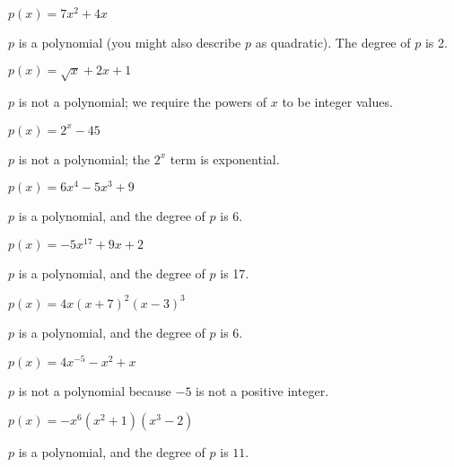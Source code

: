 \begin{exercises}
\begin{problem}
\begin{multicols}{3}
\begin{subproblem}
\begin{shortsolution}
		\end{shortsolution}
	\end{subproblem}
	\begin{subproblem}
		$p(x)=7x^2+4x$
		\begin{shortsolution}
			$p$ is a polynomial (you might also describe $p$ as quadratic). The degree of $p$ is 2.
		\end{shortsolution}
	\end{subproblem}
	\begin{subproblem}
		$p(x)=\sqrt{x}+2x+1$
		\begin{shortsolution}
			$p$ is not a polynomial; we require the powers of $x$ to be integer values.
		\end{shortsolution}
	\end{subproblem}
	\begin{subproblem}
		$p(x)=2^x-45$
		\begin{shortsolution}
			$p$ is not a polynomial; the $2^x$ term is exponential.
		\end{shortsolution}
	\end{subproblem}
	\begin{subproblem}
		$p(x)=6x^4-5x^3+9$
		\begin{shortsolution}
			$p$ is a polynomial, and the degree of $p$ is $6$.
		\end{shortsolution}
	\end{subproblem}
	\begin{subproblem}
		$p(x)=-5x^{17}+9x+2$
		\begin{shortsolution}
			$p$ is a polynomial, and the degree of $p$ is 17.
		\end{shortsolution}
	\end{subproblem}
	\begin{subproblem}
		$p(x)=4x(x+7)^2(x-3)^3$ 
		\begin{shortsolution}
			$p$ is a polynomial, and the degree of $p$ is $6$.     
		\end{shortsolution}
	\end{subproblem}
	\begin{subproblem}
		$p(x)=4x^{-5}-x^2+x$ 
		\begin{shortsolution}
			$p$ is not a polynomial because $-5$ is not a positive integer. 
		\end{shortsolution}
	\end{subproblem}
	\begin{subproblem}
		$p(x)=-x^6(x^2+1)(x^3-2)$ 
		\begin{shortsolution}
			$p$ is a polynomial, and the degree of $p$ is $11$.

\end{shortsolution}
\end{subproblem}
\end{multicols}
\end{problem}
\end{exercises}
